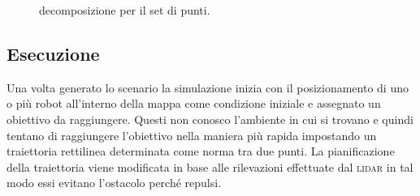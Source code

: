 \begin{figure}[!htb]
\centering
    \resizebox{0.7\linewidth}{!}{}
\caption{decomposizione per il set di punti.}
\label{fig:decomposizione}
\end{figure}

\subsection{Esecuzione}
Una volta generato lo scenario la simulazione inizia con il posizionamento di 
uno o più robot all'interno della mappa come condizione iniziale e assegnato un
obiettivo da raggiungere.
Questi non conosco l'ambiente in cui si trovano e quindi tentano di raggiungere 
l'obiettivo nella maniera più rapida impostando un traiettoria rettilinea 
determinata come norma tra due punti. 
La pianificazione della traiettoria viene modificata in base alle rilevazioni 
effettuate dal \textsc{lidar} in tal modo essi evitano l'ostacolo perché repulsi.

